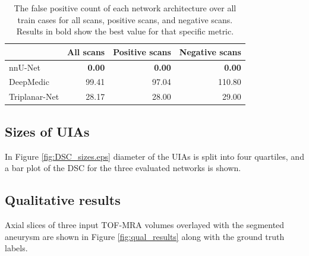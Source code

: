 \begin{table}[h]
	\centering
	\begin{tabular}{ l  r r r }
		& All scans & Positive scans & Negative scans \\
		\hline
		nnU-Net & \textbf{0.00} & \textbf{0.00} & \textbf{0.00} \\
		DeepMedic & 99.41 & 97.04 & 110.80 \\
		Triplanar-Net & 28.17 & 28.00 & 29.00 \\
	\end{tabular}
	\caption[False positive count for all scans, positive scans and negative scans.]{The false positive count of each network architecture over all train cases for all scans, positive scans, and negative scans. Results in bold show the best value for that specific metric.}
	\label{table:metrics_neg}
\end{table}

\subsection{Sizes of UIAs}
In Figure \ref{fig:DSC_sizes.eps} diameter of the UIAs is split into four quartiles, and a bar plot of the DSC for the three evaluated networks is shown.


\subsection{Qualitative results}
Axial slices of three input TOF-MRA volumes overlayed with the segmented aneurysm are shown in Figure \ref{fig:qual_results} along with the ground truth labels.

